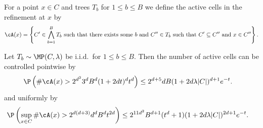 \documentclass{article}
\begin{document}
\begin{definition}

  For a point $x \in C$ and trees $T_b$ for $1 \leq b \leq B$
  we define the active cells in the refinement at $x$ by
  \begin{align*}
    \cA(x)
    = \left\{
    C' \in \bigwedge_{b=1}^B T_b
    \text{ such that there exists some } b
    \text{ and } C'' \in T_b
    \text{ such that } C' \subseteq C''
    \text{ and } x \in C''
    \right\}.
  \end{align*}

\end{definition}



\begin{lemma}
  \label{lem:active_cells}

  Let $T_b \sim \MP(C, \lambda)$ be i.i.d.\ for $1 \leq b \leq B$.
  Then the number of active cells can be controlled pointwise by
  \begin{align*}
    \P\left( \# \cA(x)
    > 2^{d^2} 3^d B^d (1+2dt)^d t^d
    \right)
    &\leq
      2^{d+5} dB (1 + 2 d \lambda |C|)^{d+1} e^{-t}.
  \end{align*}
  and uniformly by
  \begin{align*}
    \P\left(
    \sup_{x \in C} \# \cA(x)
    > 2^{d(d+3)} d^d B^d t^{2d}
    \right)
    &\leq
      2^{11d^2}
      B^{d+1} (t ^d + 1) (1 + 2 d \lambda |C|)^{2d+1} e^{-t}.
  \end{align*}
\end{lemma}
\end{document}
